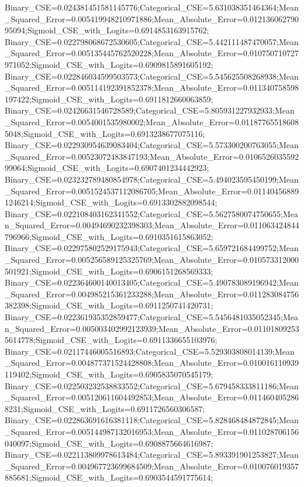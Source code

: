 Binary_CSE=0.024381451581145776;Categorical_CSE=5.631038351464364;Mean_Squared_Error=0.005419948210971886;Mean_Absolute_Error=0.01213606279095094;Sigmoid_CSE_with_Logits=0.6914853163915762;
Binary_CSE=0.022798068672530605;Categorical_CSE=5.442111487470057;Mean_Squared_Error=0.005135445762520228;Mean_Absolute_Error=0.010750710727971052;Sigmoid_CSE_with_Logits=0.6909815891605192;
Binary_CSE=0.022846034599503573;Categorical_CSE=5.545625508268938;Mean_Squared_Error=0.005114192391852378;Mean_Absolute_Error=0.011340758598197422;Sigmoid_CSE_with_Logits=0.6911812660063859;
Binary_CSE=0.02426631546728589;Categorical_CSE=5.805931227932933;Mean_Squared_Error=0.0054001535980002;Mean_Absolute_Error=0.011877655186085048;Sigmoid_CSE_with_Logits=0.6913238677075116;
Binary_CSE=0.022930954639083404;Categorical_CSE=5.573300200763055;Mean_Squared_Error=0.00523072483847193;Mean_Absolute_Error=0.010652603559299064;Sigmoid_CSE_with_Logits=0.6907401234442923;
Binary_CSE=0.023232789480854978;Categorical_CSE=5.494023595450199;Mean_Squared_Error=0.0051524537112086705;Mean_Absolute_Error=0.011404568891246214;Sigmoid_CSE_with_Logits=0.6913302882098544;
Binary_CSE=0.022108403162341552;Categorical_CSE=5.5627580074750655;Mean_Squared_Error=0.00494690232398303;Mean_Absolute_Error=0.011063424844796966;Sigmoid_CSE_with_Logits=0.6910351615863052;
Binary_CSE=0.022975802529175943;Categorical_CSE=5.659721684499752;Mean_Squared_Error=0.005256589125325769;Mean_Absolute_Error=0.010573312000501921;Sigmoid_CSE_with_Logits=0.6906151268569333;
Binary_CSE=0.022364600140013405;Categorical_CSE=5.490783089196942;Mean_Squared_Error=0.004985215361233288;Mean_Absolute_Error=0.011283084756382398;Sigmoid_CSE_with_Logits=0.6911250741420731;
Binary_CSE=0.022361935352859477;Categorical_CSE=5.5456481035052345;Mean_Squared_Error=0.005003402992123939;Mean_Absolute_Error=0.011018092535614778;Sigmoid_CSE_with_Logits=0.6911336655103976;
Binary_CSE=0.02117446005516893;Categorical_CSE=5.529303808014139;Mean_Squared_Error=0.004877371524428808;Mean_Absolute_Error=0.010016110939119402;Sigmoid_CSE_with_Logits=0.6905835070545179;
Binary_CSE=0.022503232538833552;Categorical_CSE=5.679458333811186;Mean_Squared_Error=0.005120611604492853;Mean_Absolute_Error=0.0114604052868231;Sigmoid_CSE_with_Logits=0.6911726560306587;
Binary_CSE=0.022863691616381118;Categorical_CSE=5.828468484872845;Mean_Squared_Error=0.005144987132016953;Mean_Absolute_Error=0.011028706156040097;Sigmoid_CSE_with_Logits=0.6908875664616987;
Binary_CSE=0.022113809978613484;Categorical_CSE=5.893391901253827;Mean_Squared_Error=0.004967723699684509;Mean_Absolute_Error=0.010076019357885681;Sigmoid_CSE_with_Logits=0.6903544591775614;
